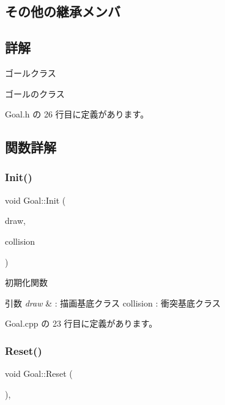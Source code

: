 \subsection*{その他の継承メンバ}


\subsection{詳解}
ゴールクラス 

ゴールのクラス 

 Goal.\+h の 26 行目に定義があります。



\subsection{関数詳解}
\mbox{\label{class_goal_a694beb5a9164e2bea59fc43affbaa060}} 
\subsubsection{\texorpdfstring{Init()}{Init()}}
{\footnotesize\ttfamily void Goal\+::\+Init (\begin{DoxyParamCaption}\item[{\mbox{\hyperlink{class_draw_base}{Draw\+Base}} $\ast$}]{draw,  }\item[{\mbox{\hyperlink{class_collision_base}{Collision\+Base}} $\ast$}]{collision }\end{DoxyParamCaption})}



初期化関数 


\begin{DoxyParams}{引数}
{\em draw} & \+: 描画基底クラス collision \+: 衝突基底クラス \\
\hline
\end{DoxyParams}


 Goal.\+cpp の 23 行目に定義があります。

\mbox{\label{class_goal_a98b797c8012ab43d6fc8c42e4e91466b}} 
\subsubsection{\texorpdfstring{Reset()}{Reset()}}
{\footnotesize\ttfamily void Goal\+::\+Reset (\begin{DoxyParamCaption}{ }\end{DoxyParamCaption})\hspace{0.3cm}{\ttfamily [override]}, {\ttfamily [virtual]}}



